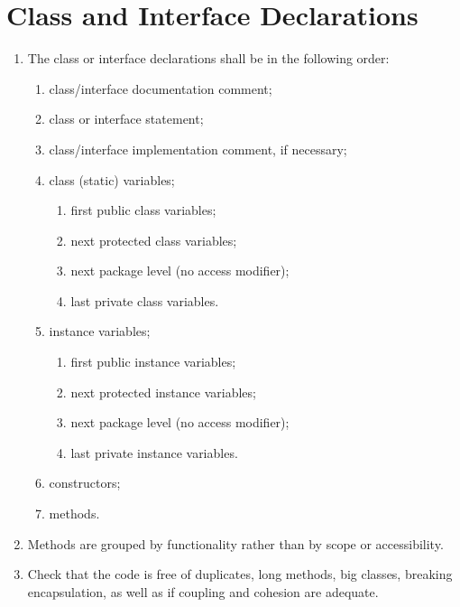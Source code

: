 \section*{Class and Interface Declarations}\begin{enumerate}[resume]
\item The class or interface declarations shall be in the following order:
	\begin{enumerate}
		\item class/interface documentation comment;
		\item class or interface statement;
		\item class/interface implementation comment, if necessary;
		\item class (static) variables;
		\begin{enumerate}
			\item first public class variables;
			\item next protected class variables;
			\item next package level (no access modifier);
			\item last private class variables.
		\end{enumerate}
		\item instance variables;
		\begin{enumerate}
			\item first public instance variables;
			\item next protected instance variables;
			\item next package level (no access modifier);
			\item last private instance variables.
		\end{enumerate}
		\item constructors;
		\item methods.
	\end{enumerate}
	\item Methods are grouped by functionality rather than by scope or accessibility.
	\item Check that the code is free of duplicates, long methods, big classes, breaking encapsulation, as well as if coupling and cohesion are adequate.
\end{enumerate}

